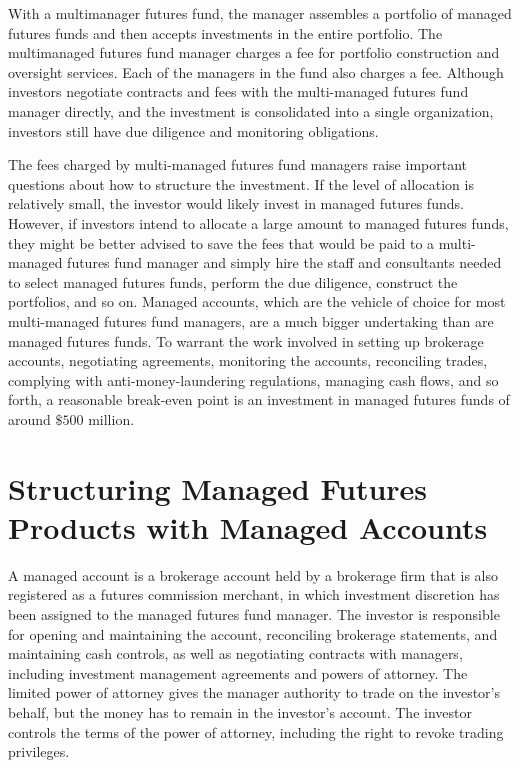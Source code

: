 \documentclass[11pt]{article}
\begin{document}
With a multimanager futures fund, the manager assembles a portfolio of managed futures funds and then accepts investments in the entire portfolio. The multimanaged futures fund manager charges a fee for portfolio construction and oversight services. Each of the managers in the fund also charges a fee. Although investors negotiate contracts and fees with the multi-managed futures fund manager directly, and the investment is consolidated into a single organization, investors still have due diligence and monitoring obligations.

The fees charged by multi-managed futures fund managers raise important questions about how to structure the investment. If the level of allocation is relatively small, the investor would likely invest in managed futures funds. However, if investors intend to allocate a large amount to managed futures funds, they might be better advised to save the fees that would be paid to a multi-managed futures fund manager and simply hire the staff and consultants needed to select managed futures funds, perform the due diligence, construct the portfolios, and so on. Managed accounts, which are the vehicle of choice for most multi-managed futures fund managers, are a much bigger undertaking than are managed futures funds. To warrant the work involved in setting up brokerage accounts, negotiating agreements, monitoring the accounts, reconciling trades, complying with anti-money-laundering regulations, managing cash flows, and so forth, a reasonable break-even point is an investment in managed futures funds of around $\$ 500$ million.

\section*{Structuring Managed Futures Products with Managed Accounts}
A managed account is a brokerage account held by a brokerage firm that is also registered as a futures commission merchant, in which investment discretion has been assigned to the managed futures fund manager. The investor is responsible for opening and maintaining the account, reconciling brokerage statements, and maintaining cash controls, as well as negotiating contracts with managers, including investment management agreements and powers of attorney. The limited power of attorney gives the manager authority to trade on the investor's behalf, but the money has to remain in the investor's account. The investor controls the terms of the power of attorney, including the right to revoke trading privileges.
\end{document}
